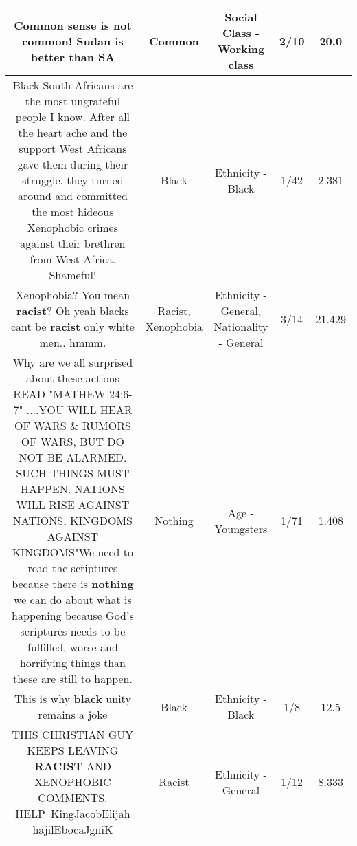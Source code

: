\documentclass[11pt]{article}
\newlength\mylength
\begin{document}
\begin{center}
\begin{longtable}{|C{.65\mylength}|C{.30\mylength}|C{.12\mylength}|C{.12\mylength}|C{.12\mylength}|}
  \small Common sense is not \textbf{common}! Sudan is better than SA\normalsize   & Common & Social Class - Working class & 2/10 & 20.0 \\  \hline
  \small Black South Africans are the most ungrateful people I know.   After all the heart ache and the support West Africans gave them during their struggle, they turned around and committed the most hideous Xenophobic crimes against their brethren from West Africa.  Shameful!\normalsize   & Black & Ethnicity - Black & 1/42 & 2.381 \\  \hline
  \small Xenophobia? You mean \textbf{racist}? Oh yeah blacks cant be \textbf{racist} only white men.. hmmm.\normalsize   & Racist, Xenophobia & Ethnicity - General, Nationality - General & 3/14 & 21.429 \\  \hline
  \small Why are we all surprised about these actions READ "MATHEW 24:6-7" ....YOU WILL HEAR OF WARS \& RUMORS OF WARS, BUT DO NOT BE ALARMED. SUCH THINGS MUST HAPPEN. NATIONS WILL RISE AGAINST  NATIONS, KINGDOMS AGAINST KINGDOMS"We need to read the scriptures because there is \textbf{nothing} we can do about what is happening because God's scriptures  needs to be fulfilled,  worse and horrifying things than these are still to happen.\normalsize   & Nothing & Age - Youngsters & 1/71 & 1.408 \\  \hline
  \small This is why \textbf{black} unity remains a joke\normalsize   & Black & Ethnicity - Black & 1/8 & 12.5 \\  \hline
  \small THIS CHRISTIAN GUY KEEPS LEAVING \textbf{RACIST} AND XENOPHOBIC COMMENTS. HELP KingJacobElijah hajilEbocaJgniK\normalsize   & Racist & Ethnicity - General & 1/12 & 8.333 \\  \hline

\end{longtable}
\end{center}
\end{document}
